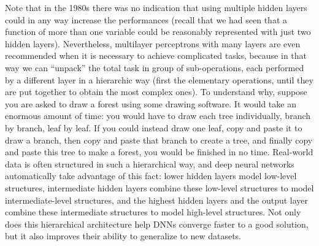 Note that in the 1980s there was no indication that using multiple hidden layers could in any way increase the performances (recall that we had seen that a function of more than one variable could be reasonably represented with just two hidden layers). Nevertheless, multilayer perceptrons with many layers are even recommended when it is necessary to achieve complicated tasks, because in that way we can ``unpack'' the total task in group of sub-operations, each performed by a different layer in a hierarchic way (first the elementary operations, until they are put together to obtain the most complex ones). To understand why, suppose you are asked to draw a forest using some drawing software. It would take an enormous amount of time: you would have to draw each tree individually, branch by branch, leaf by leaf. If you could instead draw one leaf, copy and paste it to draw a branch, then copy and paste that branch to create a tree, and finally copy and paste this tree to make a forest, you would be finished in no time. Real-world data is often structured in such a hierarchical way, and deep neural networks automatically take advantage of this fact: lower hidden layers model low-level structures, intermediate hidden layers combine these low-level structures to model intermediate-level structures, and the highest hidden layers and the output layer combine these intermediate structures to model high-level structures. Not only does this hierarchical architecture help DNNs converge faster to a good solution, but it also improves their ability to generalize to new datasets.

